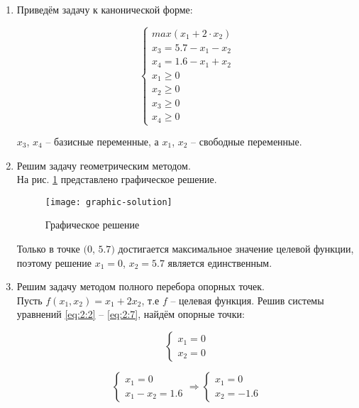 \begin{enumerate}
	
\item Приведём задачу к канонической форме:

\begin{equation}
\label{eq:2:1}
\begin{cases}
	max \left( x_1 + 2 \cdot x_2 \right)
	\\
	x_3 = 5.7 - x_1 - x_2
	\\
	x_4 = 1.6 - x_1 + x_2
	\\
	x_1 \geq 0
	\\
	x_2 \geq 0
	\\
	x_3 \geq 0	
	\\
	x_4 \geq 0
\end{cases}
\end{equation}	

$x_3$, $x_4$ -- базисные переменные, а $x_1$, $x_2$ -- свободные переменные. 

\item Решим задачу геометрическим методом.\\
\noindent На рис. \ref{pic:graphic-solution} представлено графическое решение.

\begin{figure}[H]
\begin{center}
	\texttt{[image: graphic-solution]}
	\caption{Графическое решение}
	\label{pic:graphic-solution}
\end{center}
\end{figure}

Только в точке $(0$, $5.7)$ достигается максимальное значение целевой функции, поэтому решение $x_1 = 0$, $x_2 = 5.7$ является единственным. 

\item Решим задачу методом полного перебора опорных точек.\\

Пусть $f(x_1, x_2) = x_1 + 2 x_2$, т.е $f$ -- целевая функция. Решив системы уравнений \ref{eq:2:2} -- \ref{eq:2:7}, найдём опорные точки:

\begin{equation}
\label{eq:2:2}
\begin{cases}
	x_1 = 0
	\\
	x_2 = 0
\end{cases}
\end{equation}

\begin{equation}
\begin{cases}
	x_1 = 0
	\\
	x_1 - x_2 = 1.6
\end{cases}
\Rightarrow
\begin{cases}
	x_1 = 0
	\\
	x_2 = -1.6
\end{cases}
\end{equation}


\end{enumerate}
